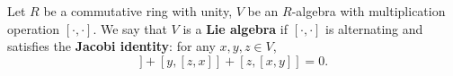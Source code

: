 \begin{definition}
  Let
    $R$ be a commutative ring with unity,
    $V$ be an $R$-algebra with multiplication operation $[\cdot, \cdot]$.
  We say that $V$ is a \textbf{Lie algebra} if $[\cdot, \cdot]$ is alternating
  and satisfies the \textbf{Jacobi identity}: for any $x, y, z \in V$,
  \begin{equation}
    [x, [y, z]] + [y, [z, x]] + [z, [x, y]] = 0.
  \end{equation}
\end{definition}
